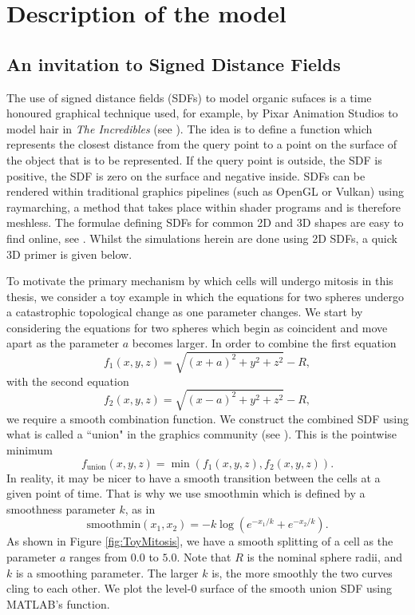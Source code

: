 \chapter{ Description of the model \label{ch:numero_uno}}
\section{An invitation to Signed Distance Fields}
The use of signed distance fields (SDFs) to model organic sufaces is a time honoured graphical technique used, for example, by Pixar Animation Studios to model hair 
in \textit{The Incredibles} (see \cite{petrovic2005volumetric}). The idea is to define a function which represents the closest distance
from the query point to a point on the surface of the object that is to be represented. If the query point is outside, the SDF is positive,
 the SDF is zero on the surface and negative inside. SDFs can be rendered within traditional graphics pipelines (such as OpenGL or Vulkan) using raymarching, 
 a method that takes place within shader programs and is therefore meshless. The formulae defining SDFs for common 2D and 3D shapes are easy to find online, see
 \cite{key}. Whilst the simulations herein are done using 2D SDFs, a quick 3D primer is given below.
 
 To motivate the primary mechanism by which cells will undergo mitosis in this thesis, we consider a toy example in which the equations for two spheres undergo a catastrophic topological change as one parameter changes. 
 We start by considering the equations for two spheres which begin as coincident and move apart as the parameter $a$ becomes larger. In order to combine the first equation
\begin{equation*}
f_1(x,y,z) =  \sqrt{ (x+a)^2+y^2+z^2 } -R,
\end{equation*}
with the second equation
\begin{equation*}
f_2(x,y,z) =  \sqrt{(x-a)^2+y^2+z^2 } - R,
\end{equation*}
we require a smooth combination function. We construct the combined SDF using what is called a ``union" in the graphics community (see \cite{fusekvisualization}).
This is the pointwise minimum 
\begin{equation*}
f_{\textrm{union}}(x,y,z) = \min(f_1(x,y,z), f_2(x,y,z)).   %
\end{equation*}
In reality, it may be nicer to have a smooth transition between the cells at a given point of time. That is why we use 
$\textrm{smoothmin}$ which is defined by a smoothness parameter $k$, as in
\begin{equation}
    \textrm{smoothmin}(x_1, x_2) = -k \log(e^{-x_1/k} + e^{-x_2/k}).
\end{equation}
As shown in Figure \ref{fig:ToyMitosis}, we have a smooth splitting of a cell as the parameter $a$ ranges from $0.0$ to $5.0$.
Note that $R$ is the nominal sphere radii, and $k$ is a smoothing parameter. The larger $k$ is, the more smoothly the two curves cling to each other. 
We plot the level-$0$ surface of the smooth union SDF using MATLAB's  function. 

